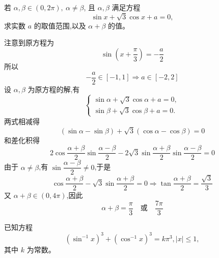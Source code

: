 \begin{questions}
    \question 若 $\alpha, \beta \in (0, 2\pi), \ \alpha \neq \beta$, 且 $\alpha, \beta$ 满足方程
    \[
    \sin x + \sqrt{3} \cos x + a = 0,
    \]
    求实数 $a$ 的取值范围,以及 $\alpha + \beta$ 的值。
    \begin{solution}
        注意到原方程为
        \[
        \sin\left(x + \frac{\pi}{3}\right) = -\frac{a}{2}
        \]
        所以 
        \[
        -\frac{a}{2} \in [-1,1] \Rightarrow a \in [-2,2]
        \]
        设 $\alpha,\beta$ 为原方程的解,有
        \[
        \begin{cases}
        \sin \alpha + \sqrt{3} \cos \alpha + a = 0, \\
        \sin \beta + \sqrt{3} \cos \beta + a = 0.
        \end{cases}
        \]
        两式相减得
        \[
        (\sin\alpha - \sin\beta) + \sqrt{3} (\cos\alpha - \cos\beta) = 0
        \]
        和差化积得
        \[
        2 \cos \frac{\alpha+\beta}{2} \sin \frac{\alpha-\beta}{2} - 2\sqrt{3} \sin \frac{\alpha+\beta}{2} \sin \frac{\alpha-\beta}{2} = 0
        \]
        由于 $\alpha \ne \beta$,有 $\sin \dfrac{\alpha-\beta}{2} \ne 0$,于是
        \[
        \cos \frac{\alpha+\beta}{2} - \sqrt{3} \sin \frac{\alpha+\beta}{2} = 0 \Rightarrow \tan \frac{\alpha+\beta}{2}  = \frac{\sqrt{3}}{3}
        \]
        又 $\alpha+\beta \in (0,4\pi)$,因此
        \[
        \alpha + \beta = \frac{\pi}{3} \quad \text{或} \quad  \frac{7\pi}{3}
        \]
    \end{solution}

    \question 已知方程
    \[
    (\sin^{-1} x)^3 + (\cos^{-1} x)^3 = k\pi^3, |x| \le 1,
    \]
    其中 $k$ 为常数。
\end{questions}
